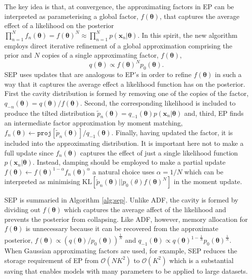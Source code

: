 The key idea is that, at convergence, the approximating factors in EP can be interpreted as parameterising a global factor,  $f(\bm{\theta})$, that captures the average effect of a likelihood on the posterior  $\prod_{n=1}^{N} f_n(\bm{\theta}) = f(\bm{\theta})^{N} \approx \prod_{n=1}^{N} p(\bm{x}_n | \bm{\theta})$. In this spirit, the new algorithm employs direct iterative refinement of a global approximation comprising the prior and $N$ copies of a single approximating factor, $f(\bm{\theta})$, %
%
\begin{equation}
q(\bm{\theta}) \propto f(\bm{\theta})^N p_0(\bm{\theta}).
\end{equation}
%
SEP uses updates that are analogous to EP's in order to refine $f(\bm{\theta})$ in such a way that it captures the average effect a likelihood function has on the posterior. First the cavity distribution is formed by removing one of the copies of the factor, $q_{-n}(\bm{\theta}) =q(\bm{\theta})/f(\bm{\theta})$. 
Second, the corresponding likelihood is included to produce the tilted distribution $\tilde{p}_n(\bm{\theta}) = q_{-1}(\bm{\theta}) p(\bm{x}_n | \bm{\theta})$ and, third, EP finds an intermediate factor approximation by moment matching, $f_n(\bm{\theta}) \leftarrow \mathtt{proj}[\tilde{p}_n(\bm{\theta})] / q_{-1}(\bm{\theta}) $. Finally, having updated the factor, it is included into the approximating distribution. It is important here not to make a full update since $f_n(\bm{\theta})$ captures the effect of just a single likelihood function  $p(\bm{x}_n | \bm{\theta})$. Instead, damping should be employed to make a partial update $f(\bm{\theta}) \leftarrow f(\bm{\theta})^{1 - \alpha} f_n(\bm{\theta})^{\alpha}$ a natural choice uses $\alpha = 1/N$ which can be interpreted as minimising  $\mathrm{KL}[\tilde{p}_n(\bm{\theta}) || p_{0}(\theta)  f(\bm{\theta})^N]$ in the moment update.

SEP is summaried in Algorithm \ref{alg:sep}. Unlike ADF, the cavity is formed by dividing out $f(\bm{\theta})$ which captures the average affect of the likelihood and prevents the posterior from collapsing. Like ADF, however, memory allocation for $f(\bm{\theta})$ is unnecessary because it can be recovered from the approximate posterior, $f(\bm{\theta}) \propto (q(\bm{\theta}) / p_0(\bm{\theta}))^{\frac{1}{N}}$ and $q_{-1}(\bm{\theta}) \propto q(\bm{\theta})^{1 - \frac{1}{N}} p_0(\bm{\theta})^{\frac{1}{N}}$. When Gaussian approximating factors are used, for example, SEP reduces the storage requirement of EP from  $\mathcal{O}(NK^2)$ to $\mathcal{O}(K^2)$ which is a substantial saving that enables models with many parameters to be applied to large datasets. 

